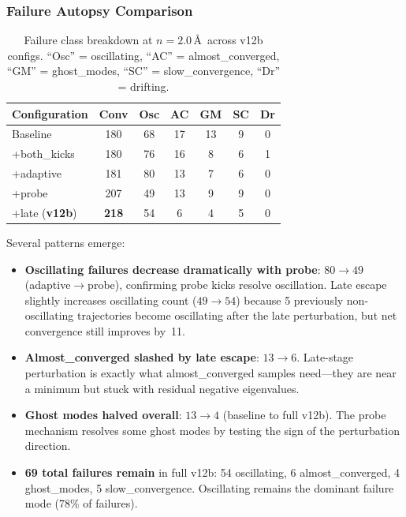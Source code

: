 \documentclass[11pt,a4paper]{article}
\theoremstyle{definition}
\begin{document}
\subsubsection{Failure Autopsy Comparison}
\label{sec:v12b-autopsy}

\begin{table}[h]
\centering
\caption{Failure class breakdown at $n=2.0$\,\AA\ across v12b configs.
  ``Osc'' = oscillating, ``AC'' = almost\_converged, ``GM'' = ghost\_modes,
  ``SC'' = slow\_convergence, ``Dr'' = drifting.}
\label{tab:v12b-autopsy}
\begin{tabular}{lcccccc}
\toprule
Configuration & Conv & Osc & AC & GM & SC & Dr \\
\midrule
Baseline            & 180 & 68 & 17 & 13 &  9 & 0 \\
+both\_kicks         & 180 & 76 & 16 &  8 &  6 & 1 \\
+adaptive            & 181 & 80 & 13 &  7 &  6 & 0 \\
+probe               & 207 & 49 & 13 &  9 &  9 & 0 \\
+late (\textbf{v12b}) & \textbf{218} & 54 &  6 &  4 &  5 & 0 \\
\bottomrule
\end{tabular}
\end{table}

Several patterns emerge:

\begin{itemize}[nosep]
  \item \textbf{Oscillating failures decrease dramatically with probe}:
    $80 \to 49$ (adaptive$\to$probe), confirming probe kicks resolve
    oscillation.  Late escape slightly increases oscillating count
    ($49 \to 54$) because 5 previously non-oscillating trajectories
    become oscillating after the late perturbation, but net convergence
    still improves by~11.
  \item \textbf{Almost\_converged slashed by late escape}:
    $13 \to 6$.  Late-stage perturbation is exactly what
    almost\_converged samples need---they are near a minimum but
    stuck with residual negative eigenvalues.
  \item \textbf{Ghost modes halved overall}: $13 \to 4$ (baseline to
    full v12b).  The probe mechanism resolves some ghost modes by
    testing the sign of the perturbation direction.
  \item \textbf{69 total failures remain} in full v12b: 54 oscillating,
    6 almost\_converged, 4 ghost\_modes, 5 slow\_convergence.
    Oscillating remains the dominant failure mode (78\% of failures).
\end{itemize}
\end{document}
